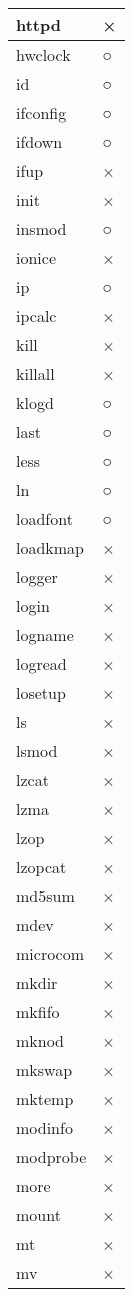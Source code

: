 \begin{longtable}{lp{50mm}}
httpd & × \\ \hline
hwclock & ○ \\ \hline
id & ○ \\ \hline
ifconfig & ○ \\ \hline
ifdown & ○ \\ \hline
ifup & × \\ \hline
init & × \\ \hline
insmod & ○ \\ \hline
ionice & × \\ \hline
ip & ○ \\ \hline
ipcalc & × \\ \hline
kill & × \\ \hline
killall & × \\ \hline
klogd & ○ \\ \hline
last & ○ \\ \hline
less & ○ \\ \hline
ln & ○ \\ \hline
loadfont & ○ \\ \hline
loadkmap & × \\ \hline
logger & × \\ \hline
login & × \\ \hline
logname & × \\ \hline
logread & × \\ \hline
losetup & × \\ \hline
ls & × \\ \hline
lsmod & × \\ \hline
lzcat & × \\ \hline
lzma & × \\ \hline
lzop & × \\ \hline
lzopcat & × \\ \hline
md5sum & × \\ \hline
mdev & × \\ \hline
microcom & × \\ \hline
mkdir & × \\ \hline
mkfifo & × \\ \hline
mknod & × \\ \hline
mkswap & × \\ \hline
mktemp & × \\ \hline
modinfo & × \\ \hline
modprobe & × \\ \hline
more & × \\ \hline
mount & × \\ \hline
mt & × \\ \hline
mv & × \\ \hline

\end{longtable}
